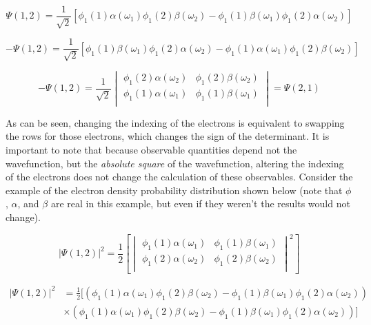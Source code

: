 \begin{equation}
\label{eq:pauli_2t_2}
\Psi(1,2) =
\frac{1}{\sqrt{2}}
\left[
\phi_{1}(1)\alpha(\omega_{1})\phi_{1}(2)\beta(\omega_{2}) -
\phi_{1}(1)\beta(\omega_{1})\phi_{1}(2)\alpha(\omega_{2})
\right]
\end{equation}

\begin{equation}
\label{eq:pauli_2t_3}
-\Psi(1,2) =
\frac{1}{\sqrt{2}}
\left[
\phi_{1}(1)\beta(\omega_{1})\phi_{1}(2)\alpha(\omega_{2}) -
\phi_{1}(1)\alpha(\omega_{1})\phi_{1}(2)\beta(\omega_{2})
\right]
\end{equation}

\begin{equation}
\label{eq:pauli_2t_4}
-\Psi(1,2) =
\frac{1}{\sqrt{2}}
\begin{vmatrix}
\phi_{1}(2)\alpha(\omega_{2})	&	\phi_{1}(2)\beta(\omega_{2})	\\
\phi_{1}(1)\alpha(\omega_{1})	&	\phi_{1}(1)\beta(\omega_{1})	\\
\end{vmatrix}
=\Psi(2,1)
\end{equation}

As can be seen, changing the indexing of the electrons is equivalent to swapping the rows for those electrons, which changes the sign of the determinant. It is important to note that because observable quantities depend not the wavefunction, but the \textit{absolute square} of the wavefunction, altering the indexing of the electrons does not change the calculation of these observables. Consider the example of the electron density probability distribution shown below (note that $\phi$, $\alpha$, and $\beta$ are real in this example, but even if they weren't the results would not change).

\begin{equation}
\label{eq:el_prob_dist_1}
|\Psi(1,2)|^{2} =
\frac{1}{2}\left[
\begin{vmatrix}
\phi_{1}(1)\alpha(\omega_{1})		&	\phi_{1}(1)\beta(\omega_{1})		\\
\phi_{1}(2)\alpha(\omega_{2})		&	\phi_{1}(2)\beta(\omega_{2})		\\
\end{vmatrix}^2
\right]
\end{equation}

\begin{equation}
\label{eq:el_prob_dist_2}
\begin{split}
|\Psi(1,2)|^{2}	&	=
\frac{1}{2}
[
\left(
\phi_{1}(1)\alpha(\omega_{1})\phi_{1}(2)\beta(\omega_{2}) -
\phi_{1}(1)\beta(\omega_{1})\phi_{1}(2)\alpha(\omega_{2})
\right)	\\
	&	\times\left(
\phi_{1}(1)\alpha(\omega_{1})\phi_{1}(2)\beta(\omega_{2}) -
\phi_{1}(1)\beta(\omega_{1})\phi_{1}(2)\alpha(\omega_{2})
\right)
]
\end{split}
\end{equation}

